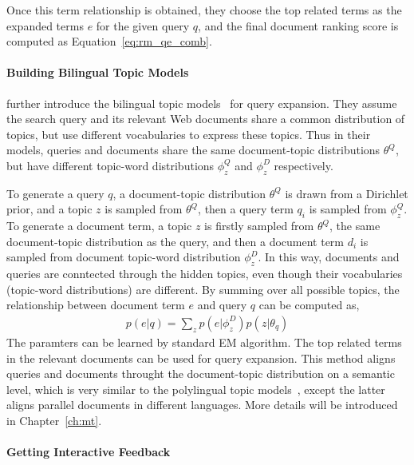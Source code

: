Once this term relationship is obtained, they choose the top related terms as the expanded terms $e$ for the given query $q$, and the final document ranking score is computed as Equation~\ref{eq:rm_qe_comb}.

\paragraph{Building Bilingual Topic Models}

\cite{Gao-2012} further introduce the bilingual topic models~\citep{Gao-2011} for query expansion. They assume the search query and its relevant Web documents share a common distribution of topics, but use different vocabularies to express these topics. Thus in their models, queries and documents share the same document-topic distributions $\theta^Q$, but have different topic-word distributions $\phi_z^Q$ and $\phi_z^D$ respectively. 

To generate a query $q$, a document-topic distribution $\theta^Q$ is drawn from a Dirichlet prior, and a topic $z$ is sampled from $\theta^Q$, then a query term $q_i$ is sampled from $\phi_z^Q$. To generate a document term, a topic $z$ is firstly sampled from $\theta^Q$, the same document-topic distribution as the query, and then a document term $d_i$ is sampled from document topic-word distribution $\phi_z^D$. In this way, documents and queries are conntected through the hidden topics, even though their vocabularies (topic-word distributions) are different. By summing over all possible topics, the relationship between document term $e$ and query $q$ can be computed as,
\begin{align}
p(e|q) = \sum_z p(e|\phi_z^D) p(z | \theta_q)
\end{align}
The paramters can be learned by standard EM algorithm. The top related terms in the relevant documents can be used for query expansion. This method aligns queries and documents throught the document-topic distribution on a semantic level, which is very similar to the polylingual topic models~\citep{mimno-09}, except the latter aligns parallel documents in different languages. More details will be introduced in Chapter~\ref{ch:mt}.


\paragraph{Getting Interactive Feedback}

